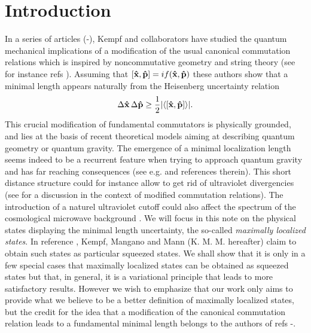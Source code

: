 \documentclass[a4paper,10pt]{article}
\newcommand{\x}{\mbox{\rm{\bf \^ x}}}
\newcommand{\p}{\mbox{\rm{\bf \^ p}}}
\newcommand{\KMM}{K. M. M. }
\begin{document}
\section{Introduction}
In a series of articles (\cite{K1}-\cite{K3}), Kempf and
collaborators have studied the quantum mechanical implications of
a modification of the usual canonical commutation relations which
is inspired by noncommutative geometry \cite{K3} and string theory
(see for instance refs \cite{stref}). Assuming that
$[\x,\p]=if(\x,\p)$ these authors show that a minimal length
appears naturally from the Heisenberg uncertainty relation
\begin{equation}
\Delta \x\,\Delta\p \geq\frac12|\langle[\x,\p]\rangle|.
\label{Heis}
\end{equation}
This crucial modification of fundamental commutators is physically
grounded, and lies at the basis of recent theoretical models
aiming at describing quantum geometry or quantum gravity. The
emergence of a minimal localization length seems indeed to be a
recurrent feature when trying to approach quantum gravity and has
far reaching consequences (see e.g. \cite{Garay} and references
therein). This short distance structure could for instance allow
to get rid of ultraviolet divergencies (see \cite{KeMa} for a
discussion in the context of modified commutation relations). The
introduction of a naturel ultraviolet cutoff could also affect the
spectrum of the cosmological microwave background \cite{K4,K5}. We
will focus in this note on the physical states displaying the
minimal length uncertainty, the so-called {\itshape maximally
localized states}. In reference \cite{K2} , Kempf, Mangano and
Mann (\KMM hereafter) claim to obtain such states as particular
squeezed states. We shall show that it is only in a few special
cases that maximally localized states can be obtained as squeezed
states but that, in general, it is a variational principle that
leads to more satisfactory results. However we wish to emphasize
that our work only aims to provide what we believe to be a better
definition of maximally localized states, but the credit for the
idea that a modification of the canonical commutation relation
leads to a fundamental minimal length belongs to the authors of
refs \cite{K1}-\cite{K3}.
\end{document}
